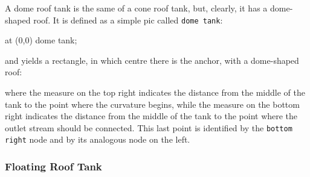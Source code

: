 \documentclass[12pt]{article}						%
\newcommand*{\chpn}[1]{\texttt{#1}}				%
\newcommand*{\chpp}[1]{\texttt{#1}}				%
\begin{document}
A dome roof tank is the same of a cone roof tank, but, clearly, it has a
dome-shaped roof. It is defined as a simple pic called \chpp{dome tank}:
\begin{chpcode}
	\pic at (0,0) {dome tank};
\end{chpcode}
and yields a rectangle, in which centre there is the anchor, with a dome-shaped
roof:
\begin{center}
\end{center}
where the measure on the top right indicates the distance from the middle of the
tank to the point where the curvature begins, while the measure on the bottom
right indicates the distance from the middle of the tank to the point where the
outlet stream should be connected. This last point is identified by the
\chpn{bottom right} node and by its analogous node on the left.

\subsubsection{Floating Roof Tank}
\end{document}
